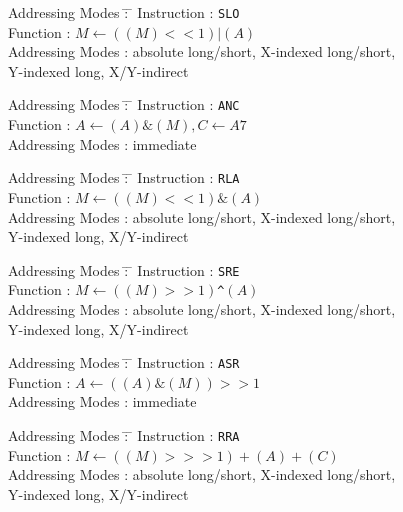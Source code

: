 \documentclass[12pt,twoside]{report}
\newcommand{\tty}[1]{{\tt #1}}
\begin{document}
\begin{tabbing}
Addressing Modes \= : \= \kill
Instruction      \> : \> \tty{SLO} \\
Function         \> : \> $M\leftarrow((M)<<1)|(A)$ \\
Addressing Modes \> : \> absolute long/short, X-indexed long/short, \\
                 \>   \> Y-indexed long, X/Y-indirect \\
\end{tabbing}

\begin{tabbing}
Addressing Modes \= : \= \kill
Instruction      \> : \> \tty{ANC} \\
Function         \> : \> $A\leftarrow(A)\&(M), C\leftarrow A7$ \\
Addressing Modes \> : \> immediate \\
\end{tabbing}

\begin{tabbing}
Addressing Modes \= : \= \kill
Instruction      \> : \> \tty{RLA} \\
Function         \> : \> $M\leftarrow((M)<<1)\&(A)$ \\
Addressing Modes \> : \> absolute long/short, X-indexed long/short, \\
                 \>   \> Y-indexed long, X/Y-indirect \\
\end{tabbing}

\begin{tabbing}
Addressing Modes \= : \= \kill
Instruction      \> : \> \tty{SRE} \\
Function         \> : \> $M\leftarrow((M)>>1)$\verb!^!$(A)$ \\
Addressing Modes \> : \> absolute long/short, X-indexed long/short, \\
                 \>   \> Y-indexed long, X/Y-indirect \\
\end{tabbing}

\begin{tabbing}
Addressing Modes \= : \= \kill
Instruction      \> : \> \tty{ASR} \\
Function         \> : \> $A\leftarrow((A)\&(M))>>1$ \\
Addressing Modes \> : \> immediate \\
\end{tabbing}

\begin{tabbing}
Addressing Modes \= : \= \kill
Instruction      \> : \> \tty{RRA} \\
Function         \> : \> $M\leftarrow((M)>>>1)+(A)+(C)$ \\
Addressing Modes \> : \> absolute long/short, X-indexed long/short, \\
                 \>   \> Y-indexed long, X/Y-indirect \\
\end{tabbing}
\end{document}
